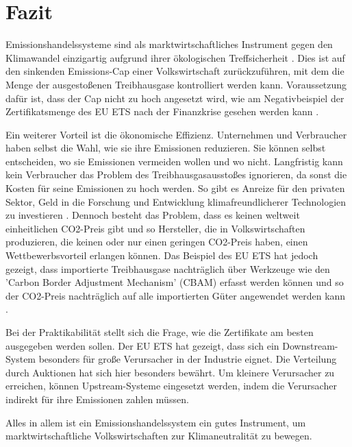 \chapter{Fazit}

Emissionshandelssysteme sind als marktwirtschaftliches Instrument gegen den Klimawandel einzigartig aufgrund ihrer ökologischen Treffsicherheit \cite[S. 182]{hubert.2020}.
Dies ist auf den sinkenden Emissions-Cap einer Volkswirtschaft zurückzuführen, mit dem die Menge der ausgestoßenen Treibhausgase kontrolliert werden kann.
Voraussetzung dafür ist, dass der Cap nicht zu hoch angesetzt wird, wie am Negativbeispiel der Zertifikatsmenge des EU ETS nach der Finanzkrise gesehen werden kann .

Ein weiterer Vorteil ist die ökonomische Effizienz. Unternehmen und Verbraucher haben selbst die Wahl, wie sie ihre Emissionen reduzieren.
Sie können selbst entscheiden, wo sie Emissionen vermeiden wollen und wo nicht. Langfristig kann kein Verbraucher das Problem des Treibhausgasausstoßes ignorieren, da sonst die Kosten für seine Emissionen zu hoch werden.
So gibt es Anreize für den privaten Sektor, Geld in die Forschung und Entwicklung klimafreundlicherer Technologien zu investieren \cite[S. 183]{hubert.2020}.
Dennoch besteht das Problem, dass es keinen weltweit einheitlichen CO2-Preis gibt und so Hersteller, die in Volkswirtschaften produzieren, die keinen oder nur einen geringen CO2-Preis haben, einen Wettbewerbsvorteil erlangen können.
Das Beispiel des EU ETS hat jedoch gezeigt, dass importierte Treibhausgase nachträglich über Werkzeuge wie den 'Carbon Border Adjustment Mechanism' (CBAM) erfasst werden können und so der CO2-Preis nachträglich auf alle importierten Güter angewendet werden kann .

Bei der Praktikabilität stellt sich die Frage, wie die Zertifikate am besten ausgegeben werden sollen. Der EU ETS hat gezeigt, dass sich ein Downstream-System besonders für große Verursacher in der Industrie eignet.
Die Verteilung durch Auktionen hat sich hier besonders bewährt. Um kleinere Verursacher zu erreichen, können Upstream-Systeme eingesetzt werden, indem die Verursacher indirekt für ihre Emissionen zahlen müssen.

Alles in allem ist ein Emissionshandelssystem ein gutes Instrument, um marktwirtschaftliche Volkswirtschaften zur Klimaneutralität zu bewegen.